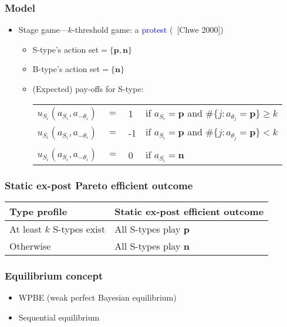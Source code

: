 \documentclass[8pt]{beamer}
\begin{document}
\begin{frame}
  \frametitle{Model}

  \begin{itemize}

  \item Stage game---\alert{$k$}-threshold game: a \textcolor{blue}{protest} (~[Chwe 2000])




\begin{itemize}
\item S-type's action set$=\{\textbf{p},\textbf{n}\}$
\item B-type's action set$=\{\textbf{n}\}$
\item (Expected) pay-offs for S-type:
\begin{table}[h]
\begin{tabular}{llll}
$u_{S_i}(a_{S_i},a_{-\theta_i})$ & $=$ & 1 & if $a_{S_i}=\textbf{p}$ and $\#\{j:a_{\theta_j}=\textbf{p}\}\geq {k}$ \\
$u_{S_i}(a_{S_i},a_{-\theta_i})$ & $=$ & -1 & if $a_{S_i}=\textbf{p}$ and $\#\{j:a_{\theta_j}=\textbf{p}\}< {k}$ \\
\\
$u_{S_i}(a_{S_i},a_{-\theta_i})$ & $=$ & 0 & if $a_{S_i}=\textbf{n}$ 
\end{tabular}

\end{table}
\end{itemize}
  

 \end{itemize}

\end{frame}



\begin{frame}
  \frametitle{Static ex-post Pareto efficient outcome}



\begin{table}[h]
\begin{tabular}{ll}
Type profile & Static ex-post efficient outcome \\
\hline
At least $k$ S-types exist & All S-types play \textbf{p}  \\
Otherwise &  All S-types play \textbf{n} 
\end{tabular}
\end{table}
\end{frame}




\begin{frame}
  \frametitle{Equilibrium concept}

\begin{itemize}
\item WPBE (weak perfect Bayesian equilibrium)
\item Sequential equilibrium
\end{itemize}
\end{frame}
\end{document}
